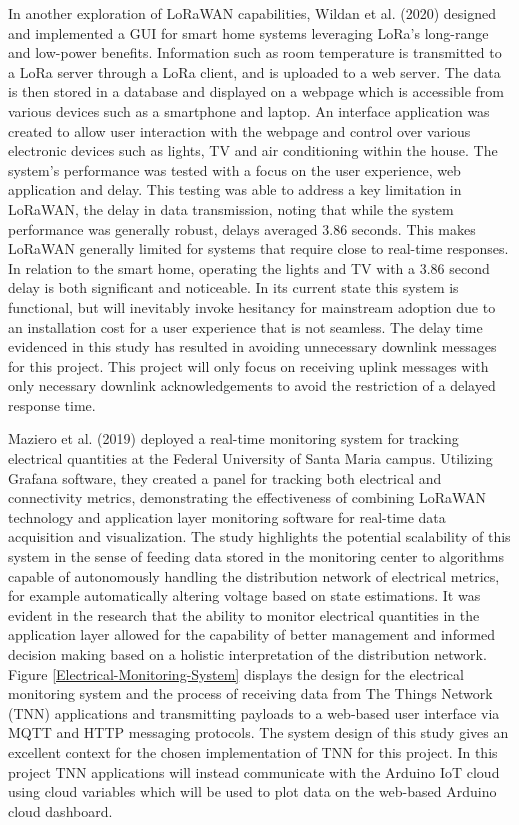 In another exploration of LoRaWAN capabilities, Wildan et al. (2020) \cite{LoRa-Smart-Home} designed and implemented a GUI for smart home systems leveraging LoRa's long-range and low-power benefits. Information such as room temperature is transmitted to a LoRa server through a LoRa client, and is uploaded to a web server. The data is then stored in a database and displayed on a webpage which is accessible from various devices such as a smartphone and laptop. An interface application was created to allow user interaction with the webpage and control over various electronic devices such as lights, TV and air conditioning within the house. The system's performance was tested with a focus on the user experience, web application and delay. This testing was able to address a key limitation in LoRaWAN, the delay in data transmission, noting that while the system performance was generally robust, delays averaged 3.86 seconds. This makes LoRaWAN generally limited for systems that require close to real-time responses. In relation to the smart home, operating the lights and TV with a 3.86 second delay is both significant and noticeable. In its current state this system is functional, but will inevitably invoke hesitancy for mainstream adoption due to an installation cost for a user experience that is not seamless. The delay time evidenced in this study has resulted in avoiding unnecessary downlink messages for this project. This project will only focus on receiving uplink messages with only necessary downlink acknowledgements to avoid the restriction of a delayed response time. 

Maziero et al. (2019) \cite{Monitoring-Electric-Parameters} deployed a real-time monitoring system for tracking electrical quantities at the Federal University of Santa Maria campus. Utilizing Grafana software, they created a panel for tracking both electrical and connectivity metrics, demonstrating the effectiveness of combining LoRaWAN technology and application layer monitoring software for real-time data acquisition and visualization. The study highlights the potential scalability of this system in the sense of feeding data stored in the monitoring center to algorithms capable of autonomously handling the distribution network of electrical metrics, for example automatically altering voltage based on state estimations. It was evident in the research that the ability to monitor electrical quantities in the application layer allowed for the capability of better management and informed decision making based on a holistic interpretation of the distribution network. Figure \ref{Electrical-Monitoring-System} displays the design for the electrical monitoring system and the process of receiving data from The Things Network (TNN) applications and transmitting payloads to a web-based user interface via MQTT and HTTP messaging protocols. The system design of this study gives an excellent context for the chosen implementation of TNN for this project. In this project TNN applications will instead communicate with the Arduino IoT cloud using cloud variables which will be used to plot data on the web-based Arduino cloud dashboard. 

